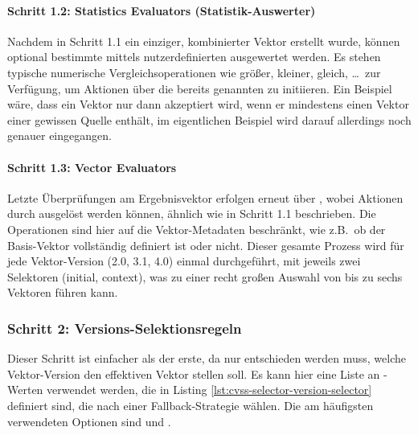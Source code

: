 
\paragraph{Schritt 1.2: Statistics Evaluators (Statistik-Auswerter)}

Nachdem in Schritt 1.1 ein einziger, kombinierter Vektor erstellt wurde, können optional bestimmte  mittels nutzerdefinierten  ausgewertet werden.
Es stehen typische numerische Vergleichsoperationen wie größer, kleiner, gleich, \dots\ zur Verfügung, um Aktionen über die bereits genannten  zu initiieren.
Ein Beispiel wäre, dass ein Vektor nur dann akzeptiert wird, wenn er mindestens einen Vektor einer gewissen Quelle enthält, im eigentlichen Beispiel wird darauf allerdings noch genauer eingegangen.

\paragraph{Schritt 1.3: Vector Evaluators}

Letzte Überprüfungen am Ergebnisvektor erfolgen erneut über , wobei Aktionen durch  ausgelöst werden können, ähnlich wie in Schritt 1.1 beschrieben.
Die Operationen sind hier auf die Vektor-Metadaten beschränkt, wie z.B.\ ob der Basis-Vektor vollständig definiert ist oder nicht.
Dieser gesamte Prozess wird für jede Vektor-Version (2.0, 3.1, 4.0) einmal durchgeführt, mit jeweils zwei Selektoren (initial, context), was zu einer recht großen Auswahl von bis zu sechs Vektoren führen kann.

\subsubsection{Schritt 2: Versions-Selektionsregeln} \label{subsubsec:projektbericht-loesungsweg-cvss-selection-rules-2}

Dieser Schritt ist einfacher als der erste, da nur entschieden werden muss, welche Vektor-Version den effektiven Vektor stellen soll.
Es kann hier eine Liste an -Werten verwendet werden, die in Listing \ref{lst:cvss-selector-version-selector} definiert sind, die nach einer Fallback-Strategie wählen.
Die am häufigsten verwendeten Optionen sind  und .

